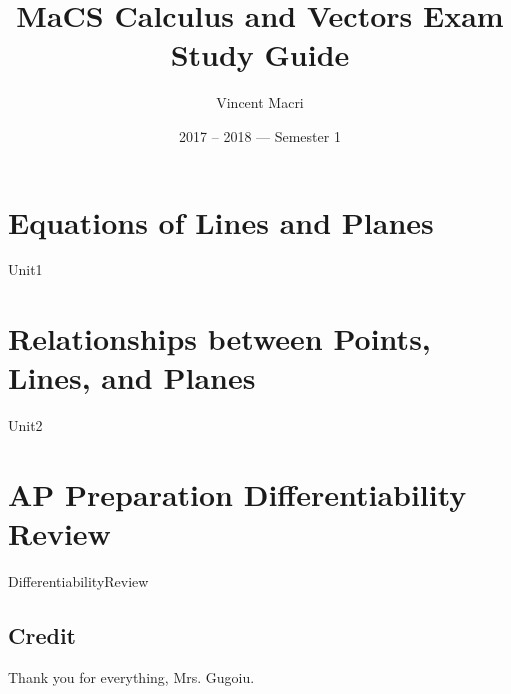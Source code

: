 \documentclass[letterpaper,12pt]{report}
\title{MaCS Calculus and Vectors Exam Study Guide}
\author{Vincent Macri}
\date{2017 -- 2018 --- Semester 1}
\begin{document}
	\maketitle
	\clearpage
	\tableofcontents
	\clearpage

	\part{Equations of Lines and Planes}
		{Unit1}
	\part{Relationships between Points, Lines, and Planes}
		{Unit2}
	\part*{AP Preparation Differentiability Review}
		\setcounter{section}{3}
		{DifferentiabilityReview}
	
	\appendix
	\chapter{Credit}
	Thank you for everything, Mrs. Gugoiu.
\end{document}
